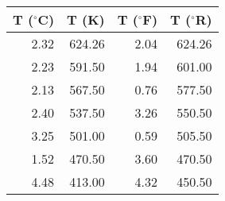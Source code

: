 \begin{tabular}{|rrrr|}\hline 
T ($^{\circ}$C) & T (K) & T ($^{\circ}$F) & T ($^{\circ}$R)\\ \hline 
    2.32 &   624.26 &     2.04 &   624.26 \\ 
    2.23 &   591.50 &     1.94 &   601.00 \\ 
    2.13 &   567.50 &     0.76 &   577.50 \\ 
    2.40 &   537.50 &     3.26 &   550.50 \\ 
    3.25 &   501.00 &     0.59 &   505.50 \\ 
    1.52 &   470.50 &     3.60 &   470.50 \\ 
    4.48 &   413.00 &     4.32 &   450.50 \\ \hline 
\end{tabular}
